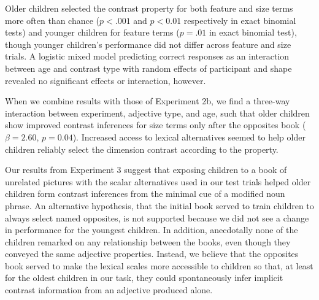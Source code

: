\documentclass[10pt,letterpaper]{article}
\begin{document}
Older children selected the contrast property for both feature and size terms more often than chance ($p < .001$ and $p < 0.01$ respectively in exact binomial tests) and younger children for feature terms ($p = .01$ in exact binomial test), though younger children's performance did not differ across feature and size trials.  A logistic mixed model predicting correct responses as an interaction between age and contrast type with random effects of participant and shape revealed no significant effects or interaction, however.

When we combine results with those of Experiment 2b, we find a three-way interaction between experiment, adjective type, and age, such that older children show improved contrast inferences for size terms only after the opposites book ($\beta = 2.60$, $p = 0.04$).  Increased access to lexical alternatives seemed to help older children reliably select the dimension contrast according to the property.  

Our results from Experiment 3 suggest that exposing children to a book of unrelated pictures with the scalar alternatives used in our test trials helped older children form contrast inferences from the minimal cue of a modified noun phrase.  An alternative hypothesis, that the initial book served to train children to always select named opposites, is not supported because we did not see a change in performance for the youngest children.  In addition, anecdotally none of the children remarked on any relationship between the books, even though they conveyed the same adjective properties.  Instead, we believe that the opposites book served to make the lexical scales more accessible to children so that, at least for the oldest children in our task, they could spontaneously infer implicit contrast information from an adjective produced alone.   

\end{document}
